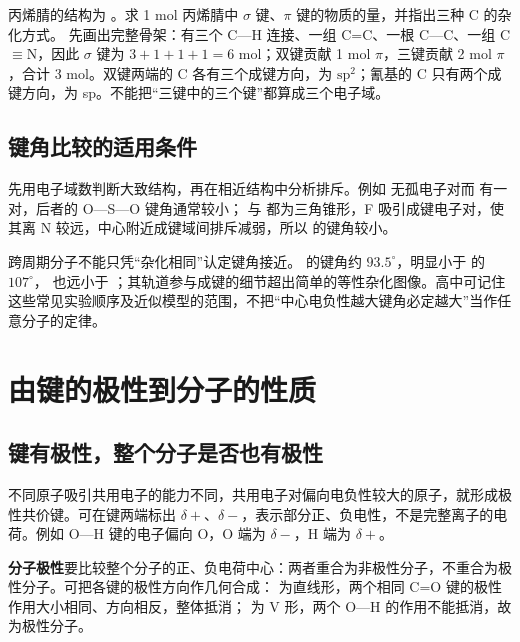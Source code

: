 \begin{liti}[同时判断杂化与数键]
丙烯腈的结构为 。求 1 mol 丙烯腈中 $\sigma$ 键、$\pi$ 键的物质的量，并指出三种 C 的杂化方式。
\tcblower
\jie 先画出完整骨架：有三个 C—H 连接、一组 C=C、一根 C—C、一组 C$\equiv$N，因此 $\sigma$ 键为 $3+1+1+1=6$ mol；双键贡献 1 mol $\pi$，三键贡献 2 mol $\pi$，合计 3 mol。双键两端的 C 各有三个成键方向，为 $\mathrm{sp}^2$；氰基的 C 只有两个成键方向，为 sp。不能把“三键中的三个键”都算成三个电子域。
\end{liti}

\subsection{键角比较的适用条件}
先用电子域数判断大致结构，再在相近结构中分析排斥。例如  无孤电子对而  有一对，后者的 O—S—O 键角通常较小； 与  都为三角锥形，F 吸引成键电子对，使其离 N 较远，中心附近成键域间排斥减弱，所以  的键角较小。

跨周期分子不能只凭“杂化相同”认定键角接近。 的键角约 $93.5^\circ$，明显小于  的 $107^\circ$， 也远小于 ；其轨道参与成键的细节超出简单的等性杂化图像。高中可记住这些常见实验顺序及近似模型的范围，不把“中心电负性越大键角必定越大”当作任意分子的定律。

\section{由键的极性到分子的性质}

\subsection{键有极性，整个分子是否也有极性}
不同原子吸引共用电子的能力不同，共用电子对偏向电负性较大的原子，就形成极性共价键。可在键两端标出 $\delta+$、$\delta-$，表示部分正、负电性，不是完整离子的电荷。例如 O—H 键的电子偏向 O，O 端为 $\delta-$，H 端为 $\delta+$。

\textbf{分子极性}要比较整个分子的正、负电荷中心：两者重合为非极性分子，不重合为极性分子。可把各键的极性方向作几何合成： 为直线形，两个相同 C=O 键的极性作用大小相同、方向相反，整体抵消； 为 V 形，两个 O—H 的作用不能抵消，故为极性分子。

